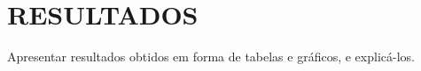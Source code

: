 \section{RESULTADOS} \label{sec:resultados}

Apresentar resultados obtidos em forma de tabelas e gráficos, e explicá-los.